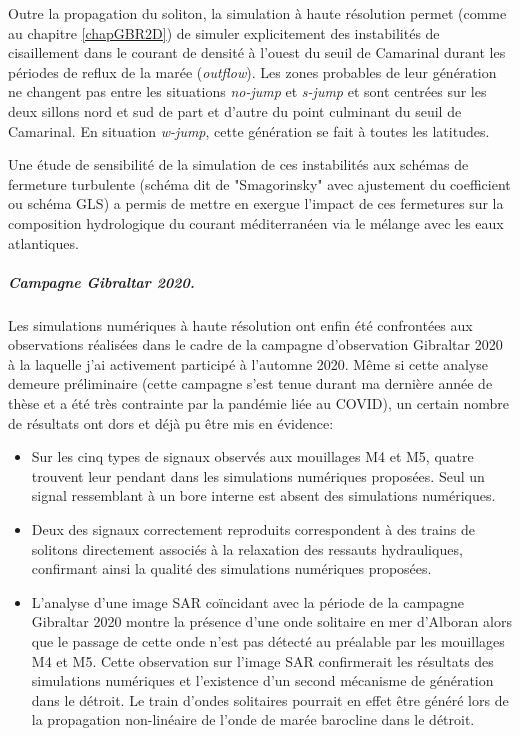 Outre la propagation du soliton, la simulation à haute résolution permet (comme au chapitre \ref{chapGBR2D}) de simuler explicitement des instabilités de cisaillement dans le courant de densité à l'ouest du seuil de Camarinal durant les périodes de \color{red}reflux\color{black} de la marée (\textit{outflow}). Les zones probables de leur génération ne changent pas entre les situations \textit{no-jump} et \textit{s-jump} et sont centrées sur les deux sillons nord et sud de part et d'autre du point culminant du seuil de Camarinal. En situation \textit{w-jump}, cette génération se fait à toutes les latitudes.

Une étude de sensibilité de la simulation de ces instabilités aux schémas de fermeture turbulente (schéma dit de "Smagorinsky" avec ajustement du coefficient ou schéma GLS) a permis de mettre en exergue l'impact de ces fermetures sur la composition hydrologique du courant méditerranéen via le mélange avec les eaux atlantiques.

\subparagraph{Campagne Gibraltar 2020.}
Les simulations numériques à haute résolution ont enfin été confrontées aux observations réalisées dans le cadre de la campagne d'observation Gibraltar 2020 à la laquelle j'ai activement participé à l'automne 2020. Même si cette analyse demeure préliminaire (cette campagne s'est tenue durant ma dernière année de thèse et a été très contrainte par la pandémie liée au COVID), un certain nombre de résultats ont dors et déjà pu être mis en évidence:
\begin{itemize}
    \item Sur les cinq types de signaux observés aux mouillages M4 et M5, quatre trouvent leur pendant dans les simulations numériques proposées. Seul un signal ressemblant à un bore interne est absent des simulations numériques.
    \item Deux des signaux correctement reproduits correspondent à des trains de solitons directement associés à la relaxation des ressauts hydrauliques, confirmant ainsi la qualité des simulations numériques proposées.
    \item L'analyse d'une image SAR coïncidant avec la période de la campagne Gibraltar 2020 montre la présence d'une onde solitaire en mer d'Alboran alors que le passage de cette onde n'est pas détecté au préalable par les mouillages M4 et M5. Cette observation sur l'image SAR confirmerait les résultats des simulations numériques et l'existence d'un second mécanisme de génération dans le détroit. Le train d'ondes solitaires pourrait en effet être généré lors de la propagation non-linéaire de l'onde de marée barocline dans le détroit.
\end{itemize}

